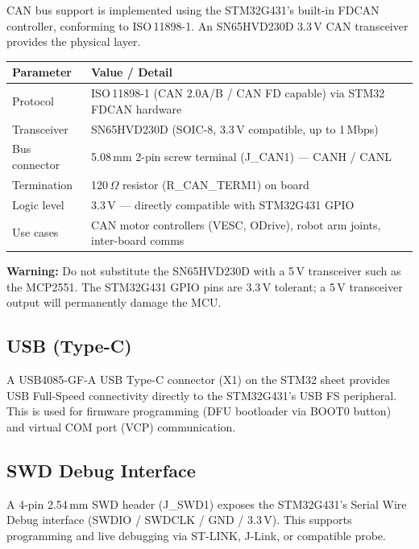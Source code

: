 \documentclass[11pt,a4paper]{article}
\begin{document}
CAN bus support is implemented using the STM32G431's built-in FDCAN controller, conforming to ISO\,11898-1. An SN65HVD230D 3.3\,V CAN transceiver provides the physical layer.

\begin{longtable}{p{4cm} p{11cm}}
  \toprule
  \rowcolor{headergray}\color{white}\textbf{Parameter} & \color{white}\textbf{Value / Detail} \\
  \midrule\endhead
  Protocol & ISO\,11898-1 (CAN 2.0A/B / CAN FD capable) via STM32 FDCAN hardware \\
  Transceiver & SN65HVD230D (SOIC-8, 3.3\,V compatible, up to 1\,Mbps) \\
  Bus connector & 5.08\,mm 2-pin screw terminal (J\_CAN1) --- CANH / CANL \\
  Termination & 120\,$\Omega$ resistor (R\_CAN\_TERM1) on board \\
  Logic level & 3.3\,V --- directly compatible with STM32G431 GPIO \\
  Use cases & CAN motor controllers (VESC, ODrive), robot arm joints, inter-board comms \\
  \bottomrule
\end{longtable}

\begin{warningbox}
\textbf{Warning:} Do not substitute the SN65HVD230D with a 5\,V transceiver such as the MCP2551. The STM32G431 GPIO pins are 3.3\,V tolerant; a 5\,V transceiver output will permanently damage the MCU.
\end{warningbox}

\subsection{USB (Type-C)}

A USB4085-GF-A USB Type-C connector (X1) on the STM32 sheet provides USB Full-Speed connectivity directly to the STM32G431's USB FS peripheral. This is used for firmware programming (DFU bootloader via BOOT0 button) and virtual COM port (VCP) communication.

\subsection{SWD Debug Interface}

A 4-pin 2.54\,mm SWD header (J\_SWD1) exposes the STM32G431's Serial Wire Debug interface (SWDIO / SWDCLK / GND / 3.3\,V). This supports programming and live debugging via ST-LINK, J-Link, or compatible probe.
\end{document}
